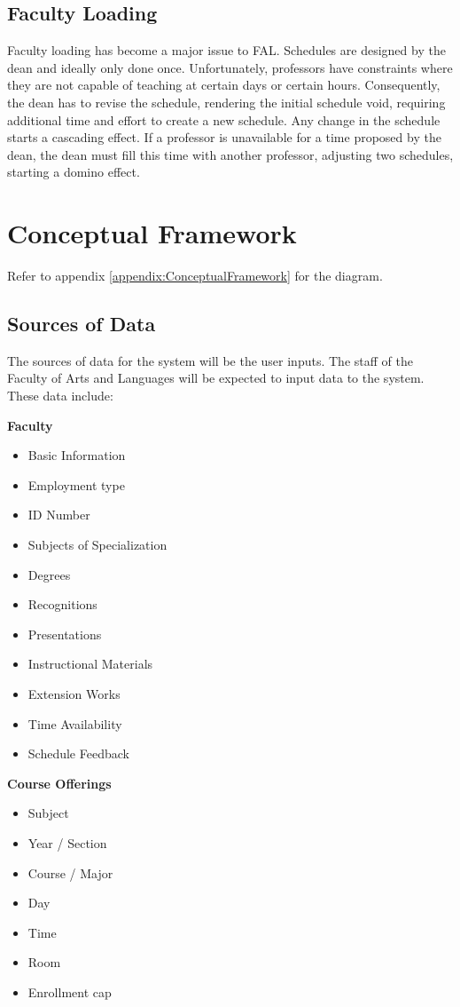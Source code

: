 \subsection{Faculty Loading}
Faculty loading has become a major issue to FAL. Schedules are designed by the dean and ideally only done once. Unfortunately, professors have constraints where they are not capable of teaching at certain days or certain hours. Consequently, the dean has to revise the schedule, rendering the initial schedule void, requiring additional time and effort to create a new schedule. Any change in the schedule starts a cascading effect. If a professor is unavailable for a time proposed by the dean, the dean must fill this time with another professor, adjusting two schedules, starting a domino effect.

\section{Conceptual Framework}
Refer to appendix \ref{appendix:ConceptualFramework} for the diagram.

\subsection{Sources of Data}
The sources of data for the system will be the user inputs. The staff of the Faculty of Arts and Languages will be expected to input data to the system. These data include: 

\textbf{Faculty}
\begin{itemize}
\item Basic Information
\item Employment type
\item ID Number
\item Subjects of Specialization
\item Degrees
\item Recognitions
\item Presentations
\item Instructional Materials
\item Extension Works
\item Time Availability
\item Schedule Feedback
\end{itemize}

\textbf{Course Offerings}
\begin{itemize}
\item Subject
\item Year / Section
\item Course / Major
\item Day
\item Time
\item Room
\item Enrollment cap
\end{itemize}

